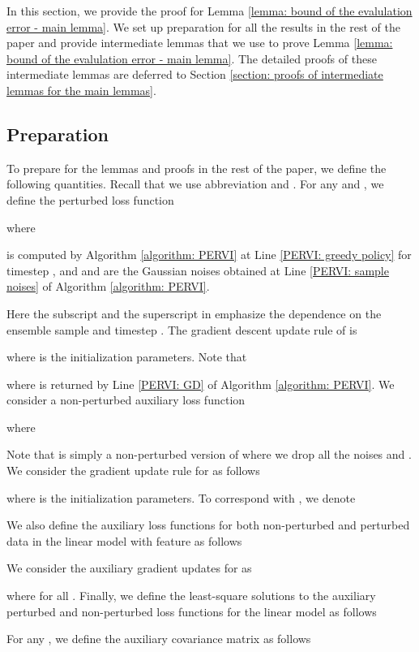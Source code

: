 \documentclass{article} \usepackage{iclr2023/iclr2023_conference,times}
\begin{document}
In this section, we provide the proof for Lemma \ref{lemma: bound of the evalulation error - main lemma}. We set up preparation for all the results in the rest of the paper and provide intermediate lemmas that we use to prove Lemma \ref{lemma: bound of the evalulation error - main lemma}. The detailed proofs of these intermediate lemmas are deferred to Section \ref{section: proofs of intermediate lemmas for the main lemmas}. 

\subsection{Preparation}
To prepare for the lemmas and proofs in the rest of the paper, we define the following quantities. Recall that we use abbreviation  and . For any  and , we define the perturbed loss function

where

 is computed by Algorithm \ref{algorithm: PERVI} at Line \ref{PERVI: greedy policy} for timestep , and  and  are the Gaussian noises obtained at Line \ref{PERVI: sample noises} of Algorithm \ref{algorithm: PERVI}. 

Here the subscript  and the superscript  in  emphasize the dependence on the ensemble sample  and timestep . The gradient descent update rule of  is

where  is the initialization parameters. Note that 

where  is returned by Line \ref{PERVI: GD} of Algorithm \ref{algorithm: PERVI}. We consider a non-perturbed auxiliary loss function 

where 

Note that  is simply a non-perturbed version of  where we drop all the noises  and . We consider the gradient update rule for  as follows

where  is the initialization parameters. To correspond with , we denote 


We also define the auxiliary loss functions for both non-perturbed and perturbed data in the linear model with feature  as follows




We consider the auxiliary gradient updates for  as 


where  for all . Finally, we  define the least-square solutions to the auxiliary perturbed and non-perturbed loss functions for the linear model as follows  



For any , we define the auxiliary covariance matrix  as follows 
\end{document}
